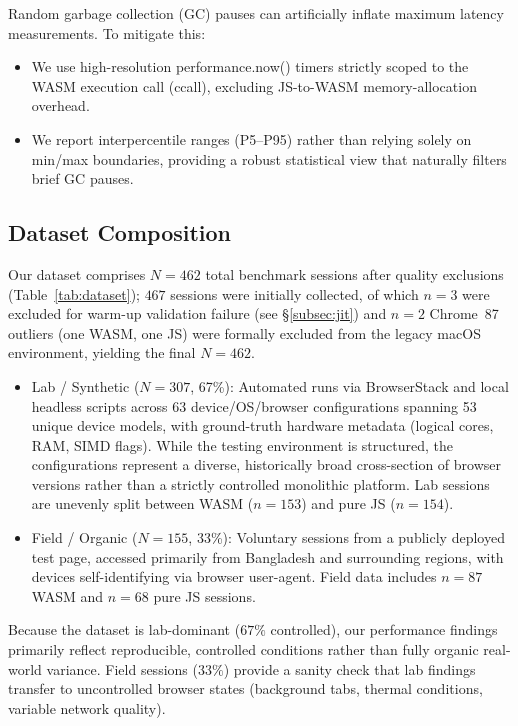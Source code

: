 \documentclass[11pt,a4paper]{article}
\def\textbf#1{#1}%
\def\texttt#1{#1}%
\begin{document}
Random garbage collection (GC) pauses can artificially inflate maximum latency measurements. To mitigate this:
\begin{itemize}
    \item We use high-resolution \texttt{performance.now()} timers strictly scoped to the WASM execution call (\texttt{ccall}), excluding JS-to-WASM memory-allocation overhead.
    \item We report interpercentile ranges (P5--P95) rather than relying solely on min/max boundaries, providing a robust statistical view that naturally filters brief GC pauses.
\end{itemize}

\subsection{Dataset Composition}
\label{subsec:dataset}

Our dataset comprises $N=462$ total benchmark sessions after quality exclusions (Table~\ref{tab:dataset}); $467$ sessions were initially collected, of which $n=3$ were excluded for warm-up validation failure (see \S\ref{subsec:jit}) and $n=2$ Chrome~87 outliers (one WASM, one JS) were formally excluded from the legacy macOS environment, yielding the final $N=462$.
\begin{itemize}
    \item \textbf{Lab / Synthetic ($N=307$, 67\%):} Automated runs via BrowserStack and local headless scripts across 63 device/OS/browser configurations spanning 53 unique device models, with ground-truth hardware metadata (logical cores, RAM, SIMD flags). While the testing environment is structured, the configurations represent a diverse, historically broad cross-section of browser versions rather than a strictly controlled monolithic platform. Lab sessions are unevenly split between WASM ($n=153$) and pure JS ($n=154$).
    \item \textbf{Field / Organic ($N=155$, 33\%):} Voluntary sessions from a publicly deployed test page, accessed primarily from Bangladesh and surrounding regions, with devices self-identifying via browser user-agent. Field data includes $n=87$ WASM and $n=68$ pure JS sessions.
\end{itemize}

Because the dataset is lab-dominant ($67\%$ controlled), our performance findings primarily reflect reproducible, controlled conditions rather than fully organic real-world variance. Field sessions ($33\%$) provide a sanity check that lab findings transfer to uncontrolled browser states (background tabs, thermal conditions, variable network quality).
\end{document}
